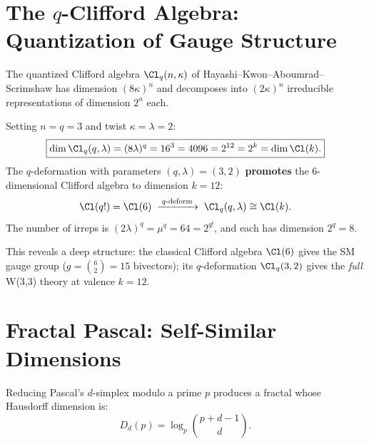 \section{\texorpdfstring{The $q$-Clifford Algebra: Quantization of Gauge Structure}{The q-Clifford Algebra: Quantization of Gauge Structure}}
\label{sec:qclifford}

The quantized Clifford algebra $\Cl_q(n,\kappa)$ of Hayashi--Kwon--Aboumrad--Scrimshaw
has dimension $(8\kappa)^n$ and decomposes into $(2\kappa)^n$ irreducible
representations of dimension $2^n$ each.

\begin{theorem}
\label{thm:qcliff-promotion}
Setting $n=q=3$ and twist $\kappa=\lambda=2$:
\begin{equation}
\boxed{
\dim\Cl_q(q,\lambda) = (8\lambda)^q = 16^3 = 4096 = 2^{12} = 2^k = \dim\Cl(k).
}
\end{equation}
The $q$-deformation with parameters $(q,\lambda)=(3,2)$
\textbf{promotes} the 6-dimensional Clifford algebra to dimension $k=12$:
\begin{equation}
\Cl(q!) = \Cl(6) \;\xrightarrow{\;\text{$q$-deform}\;}\; \Cl_q(q,\lambda) \cong \Cl(k).
\end{equation}
The number of irreps is $(2\lambda)^q = \mu^q = 64 = 2^{q!}$,
and each has dimension $2^q = 8$.
\end{theorem}

This reveals a deep structure: the classical Clifford algebra $\Cl(6)$
gives the SM gauge group ($g = \binom{6}{2} = 15$ bivectors);
its $q$-deformation $\Cl_q(3,2)$ gives the \emph{full} W(3,3) theory
at valence $k=12$.


\section{Fractal Pascal: Self-Similar Dimensions}
\label{sec:fractal-pascal}

Reducing Pascal's $d$-simplex modulo a prime $p$ produces a fractal
whose Hausdorff dimension is:
\begin{equation}
D_d(p) = \log_p\binom{p+d-1}{d}.
\end{equation}


